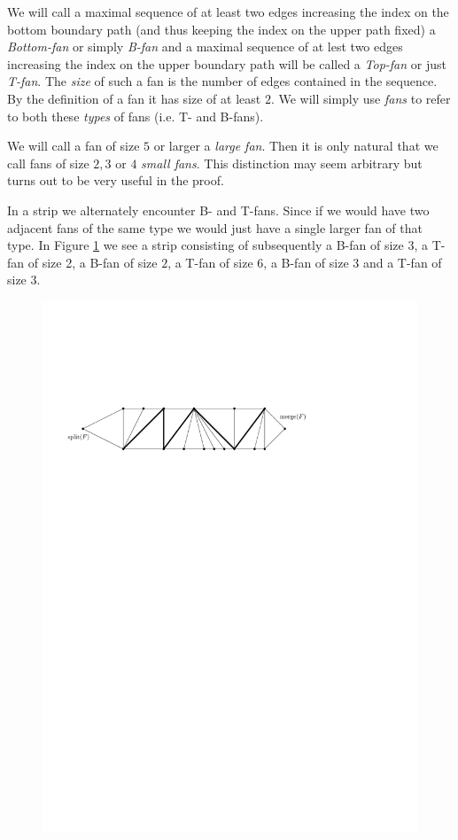  We will call a maximal sequence of at least two edges increasing the index on the bottom boundary path (and thus keeping the index on the upper path fixed) a \emph{Bottom-fan} or simply \emph{B-fan} and a maximal sequence of at lest two edges increasing the index on the upper boundary path will be called a \emph{Top-fan} or just \emph{T-fan}. The \emph{size} of such a fan is the number of edges contained in the sequence. By the definition of a fan it has size of at least $2$.
  We will simply use \emph{fans} to refer to both these \emph{types} of fans (i.e. T- and B-fans).

 We will call a fan of size $5$ or larger a \emph{large fan}. Then it is only natural that we call fans of size $2, 3$ or $4$ \emph{small fans}. This distinction may seem arbitrary but turns out to be very useful in the proof.


 In a strip we alternately encounter B- and T-fans. Since if we would have two adjacent fans of the same type we would just have a single larger fan of that type.
 In Figure \ref{fig:uni:fans} we see a strip consisting of subsequently a B-fan of size $3$, a T-fan of size 2, a B-fan of size $2$, a T-fan of size $6$, a B-fan of size $3$ and a T-fan of size $3$.

 \begin{figure}[h]
   \centering
   \includegraphics[scale=.9]{unifiedAlgo/img/fans}
   \caption{}
   \label{fig:uni:fans}
 \end{figure}


